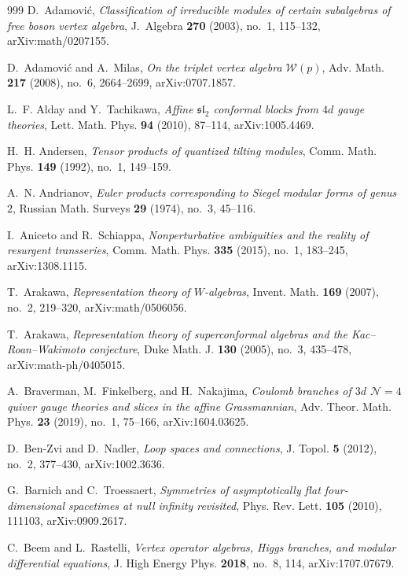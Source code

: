 \documentclass[11pt]{memoir}
\begin{document}
\begin{thebibliography}{999}
D.~Adamovi\'c, \emph{Classification of irreducible modules of certain subalgebras of free boson vertex algebra}, J.~Algebra \textbf{270} (2003), no.~1, 115--132, arXiv:math/0207155.

D.~Adamovi\'c and A.~Milas, \emph{On the triplet vertex algebra $\mathcal W(p)$}, Adv. Math. \textbf{217} (2008), no.~6, 2664--2699, arXiv:0707.1857.

L.~F. Alday and Y.~Tachikawa, \emph{Affine $\mathfrak{sl}_2$ conformal blocks from $4d$ gauge theories}, Lett. Math. Phys. \textbf{94} (2010), 87--114, arXiv:1005.4469.

H.~H. Andersen, \emph{Tensor products of quantized tilting modules}, Comm. Math. Phys. \textbf{149} (1992), no.~1, 149--159.

A.~N. Andrianov, \emph{Euler products corresponding to Siegel modular forms of genus $2$}, Russian Math. Surveys \textbf{29} (1974), no.~3, 45--116.

I.~Aniceto and R.~Schiappa, \emph{Nonperturbative ambiguities and the reality of resurgent transseries}, Comm. Math. Phys. \textbf{335} (2015), no.~1, 183--245, arXiv:1308.1115.

T.~Arakawa, \emph{Representation theory of $W$-algebras}, Invent. Math. \textbf{169} (2007), no.~2, 219--320, arXiv:math/0506056.

T.~Arakawa, \emph{Representation theory of superconformal algebras and the Kac--Roan--Wakimoto conjecture}, Duke Math. J. \textbf{130} (2005), no.~3, 435--478, arXiv:math-ph/0405015.

A.~Braverman, M.~Finkelberg, and H.~Nakajima, \emph{Coulomb branches of $3d$ $\mathcal N=4$ quiver gauge theories and slices in the affine Grassmannian}, Adv. Theor. Math. Phys. \textbf{23} (2019), no.~1, 75--166, arXiv:1604.03625.

D.~Ben-Zvi and D.~Nadler, \emph{Loop spaces and connections}, J. Topol. \textbf{5} (2012), no.~2, 377--430, arXiv:1002.3636.

G.~Barnich and C.~Troessaert, \emph{Symmetries of asymptotically flat four-dimensional spacetimes at null infinity revisited}, Phys. Rev. Lett. \textbf{105} (2010), 111103, arXiv:0909.2617.

C.~Beem and L.~Rastelli, \emph{Vertex operator algebras, Higgs branches, and modular differential equations}, J. High Energy Phys. \textbf{2018}, no.~8, 114, arXiv:1707.07679.


\end{thebibliography}
\end{document}
